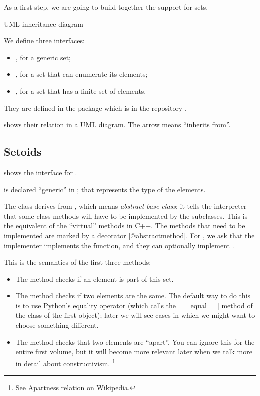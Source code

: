 
As a first step, we are going to build together the support for sets.

\begin{marginfigure}

    \caption{UML inheritance diagram}
    \label{fig:Setoid-inheritance}
\end{marginfigure}

We define three interfaces:
\begin{itemize}
    \item \Setoid, for a generic set;
    \item \EnumerableSet, for a set that can enumerate its elements;
    \item \FiniteSet, for a set that has a finite set of elements.
\end{itemize}

They are defined in the package  which is in the repository .

 shows their relation in a UML diagram.
The arrow means ``inherits from''.

\subsection*{Setoids}

 shows the interface for \Setoid.


\Setoid is declared ``generic'' in ; that represents the type of the elements.

The class \Setoid  derives from \ABC, which means \emph{abstract base class}; it tells the interpreter that some class methods will have to be implemented by the subclasses.
This is the equivalent of the ``virtual'' methods in C++.
The methods that need to be implemented are marked by a decorator \pystr|@abstractmethod|.
For \Setoid, we ask that the implementer implements the  function, and they can optionally implement .

This is the semantics of the first three methods:

\begin{itemize}
    \item The method  checks if an element is part of this set.
    \item The method  checks if two elements are the same.
          The default way to do this is to use Python's equality operator (which calls the \pystr|__equal__| method of the class of the first object); later we will see cases in which we might want to choose something different.
    \item The method  checks that two elements are ``apart''.
          You can ignore this for the entire first volume, but it will become more relevant later when we talk more in detail about constructivism.
          \footnote{%
              See \href{https://en.wikipedia.org/wiki/Apartness_relation}{Apartness relation} on Wikipedia.
          }
\end{itemize}

